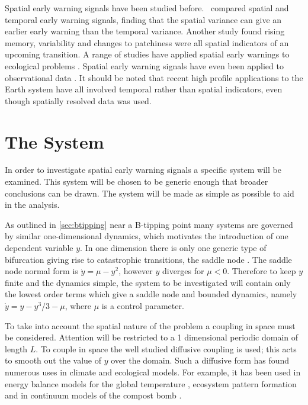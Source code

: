 Spatial early warning signals have been studied before.~\cite{Donangelo2010} compared spatial and temporal early warning signals, finding that the spatial variance
can give an earlier early warning than the temporal variance. Another study \parencite{Kefi2014} found rising memory, variability and changes to patchiness were all
spatial indicators of an upcoming transition. A range of studies have applied spatial early warnings to ecological problems \parencite{Carpenter2010,Dakos2011,Guttal2009}.
Spatial early warning signals have even been applied to observational data \parencite{Tirabassi2023,Kefi2007,Eby2017}. It should be noted that recent high profile applications to
the Earth system \parencite{Boulton2022,Boers2021,Boers2021a,Ditlevsen2023} have all involved temporal rather than spatial indicators, even though spatially resolved data was used.

\section{The System}
In order to investigate spatial early warning signals a specific system will be examined. This system will be chosen
to be generic enough that broader conclusions can be drawn. The system will be made as simple as possible to aid in the analysis.

As outlined in \cref{sec:btipping} near a B-tipping point many systems are governed by similar one-dimensional dynamics, which motivates the introduction of one dependent
variable $y$. In one dimension there is only one generic type of bifurcation giving rise to catastrophic transitions, the saddle node \parencite{Thompson1994}. The saddle node normal form is
$\dot{y} = \mu - y^2$, however $y$ diverges for $\mu < 0$. Therefore to keep $y$ finite and the dynamics simple, the system to be investigated will contain only the lowest order terms
which give a saddle node and bounded dynamics, namely $\dot{y} = y - y^3/3 - \mu$, where $\mu$ is a control parameter.

To take into account the spatial nature of the problem a coupling in space must be considered. Attention will be restricted to a 1 dimensional
periodic domain of length $L$. To couple in space the well studied diffusive coupling is used; this acts to smooth out the value of $y$ over the domain.
Such a diffusive form has found numerous uses in climate and ecological models. For example, it has been used in energy balance models for
the global temperature \parencite{Ghil1976}, ecosystem pattern formation \parencite{Gowda2014,Bastiaansen2018} and in continuum models of the compost bomb \parencite{Clarke2021}.

